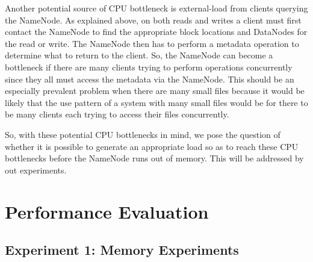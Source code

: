 \documentclass[11pt, a4paper]{article}
\begin{document}
\begin{multicols*}{2}


Another potential source of CPU bottleneck is external-load from clients querying the NameNode. As explained above, on both reads and writes a client must first contact the NameNode to find the appropriate block locations and DataNodes for the read or write. The NameNode then has to perform a metadata operation to determine what to return to the client. So, the NameNode can become a bottleneck if there are many clients trying to perform operations concurrently since they all must access the metadata via the NameNode. This should be an especially prevalent problem when there are many small files because it would be likely that the use pattern of a system with many small files would be for there to be many clients each trying to access their files concurrently. 

So, with these potential CPU bottlenecks in mind, we pose the question of whether it is possible to generate an appropriate load so as to reach these CPU bottlenecks before the NameNode runs out of memory. This will be addressed by out experiments.

\section{Performance Evaluation}




\subsection{Experiment 1: Memory Experiments}


\end{multicols*}
\end{document}
